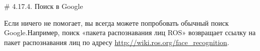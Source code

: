 # 4.17.4. Поиск в Google


Если ничего не помогает, вы всегда можете попробовать обычный поиск Google.Например, поиск «пакета распознавания лиц ROS» возвращает ссылку на пакет распознавания лиц по адресу \href{http://wiki.ros.org/face_recognition}{http://wiki.ros.org/face\_recognition}.

